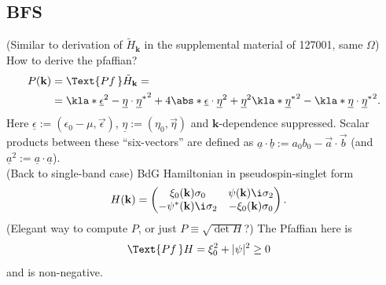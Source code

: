\documentclass[english, parskip=full]{scrartcl}
\newcommand{\qna}[1]{\color{red}#1\color{black}}
\begin{document}
\subsection{BFS}
(Similar to derivation of $\tilde{H}_\textbf{k}$ in the supplemental material of 127001, same $\Omega$)\\
\qna{How to derive the pfaffian?}
\begin{align}
P(\textbf{k}) &= \Text{Pf\,} \tilde{H}_\textbf{k} = \\
&= \kla*{\underline{\epsilon}^2 - \underline{\eta} \cdot \underline{\eta}^\ast }^2 + 4\abs*{\underline{\epsilon} \cdot \underline{\eta}}^2 + \underline{\eta}^2 \kla*{\underline{\eta}^\ast}^2 - \kla*{\underline{\eta} \cdot \underline{\eta}^\ast}^2.
\end{align}
Here $\underline{\epsilon} := (\epsilon_0 - \mu, \vec{\epsilon})$, $\underline{\eta} := (\eta_0, \vec{\eta})$ and $\textbf{k}$-dependence suppressed.
Scalar products between these ``six-vectors'' are defined as $\underline{a} \cdot \underline{b} := a_0 b_0 - \vec{a}\cdot \vec{b}$ (and $\underline{a}^2 := \underline{a}\cdot \underline{a}$).\\
(Back to single-band case) BdG Hamiltonian in \qna{pseudospin-singlet} form
\begin{align}
H(\textbf{k}) &= \begin{pmatrix}
\xi_0(\textbf{k}) \sigma_0 & \psi(\textbf{k}) \i\sigma_2 \\ 
-\psi^\ast (\textbf{k}) \i\sigma_2 & -\xi_0(\textbf{k}) \sigma_0
\end{pmatrix}.
\end{align}
(\qna{Elegant way to compute $P$, or just $P \equiv \sqrt{\det H}$?}) The Pfaffian here is
\begin{align}
\Text{Pf\,} H &= \xi_0^2 + |\psi|^2 \ge 0
\end{align}
and is non-negative.
\end{document}
